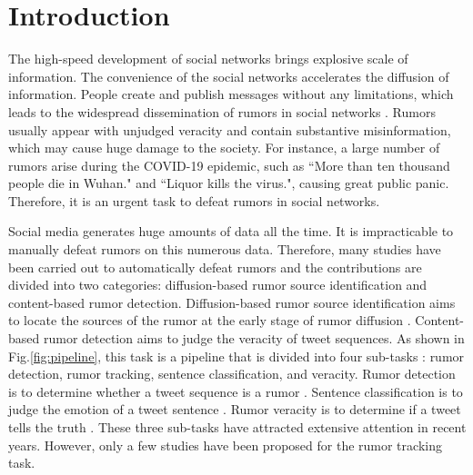 \section{Introduction}
\label{sec:introduction}
The high-speed development of social networks brings explosive scale of information. The convenience of the social networks accelerates the diffusion of information. People create and publish messages without any limitations, which leads to the widespread dissemination of rumors in social networks \cite{DBLP:journals/corr/KurkaGZ15, DBLP:journals/csur/ZubiagaABLP18, DBLP:conf/sirocco/KostkaOW08, vosoughi2018spread}. Rumors usually appear with unjudged veracity and contain substantive misinformation, which may cause huge damage to the society. For instance, a large number of rumors arise during the COVID-19 epidemic, such as ``More than ten thousand people die in Wuhan." and ``Liquor kills the virus.", causing great public panic. Therefore, it is an urgent task to defeat rumors in social networks.

Social media generates huge amounts of data all the time. It is impracticable to manually defeat rumors on this numerous data. Therefore, many studies have been carried out to automatically defeat rumors and the contributions are divided into two categories: diffusion-based rumor source identification and content-based rumor detection. Diffusion-based rumor source identification aims to locate the sources of the rumor at the early stage of rumor diffusion \cite{DBLP:conf/sigmetrics/ShahZ10, DBLP:journals/tit/ShahZ11, DBLP:conf/kdd/LappasTGM10}. Content-based rumor detection aims to judge the veracity of tweet sequences. As shown in Fig.\ref{fig:pipeline}, this task is a pipeline that is divided into four sub-tasks \cite{DBLP:journals/csur/ZubiagaABLP18, DBLP:conf/coling/KochkinaLZ18}: rumor detection, rumor tracking, sentence classification, and veracity. Rumor detection is to determine whether a tweet sequence is a rumor  \cite{DBLP:conf/socinfo/ZubiagaLP17, DBLP:conf/www/Ma0W19,DBLP:conf/naacl/NguyenDCD19, DBLP:journals/corr/abs-1906-05659}. Sentence classification is to judge the emotion of a tweet sentence \cite{DBLP:conf/semeval/EnayetE17, DBLP:conf/semeval/X17a, DBLP:conf/coling/ZubiagaKLPL16}. Rumor veracity is to determine if a tweet tells the truth \cite{DBLP:conf/coling/KochkinaLZ18, DBLP:conf/acl/LiZS19, DBLP:conf/acl/KumarC19}. These three sub-tasks have attracted extensive attention in recent years. However, only a few studies have been proposed for the rumor tracking task.

